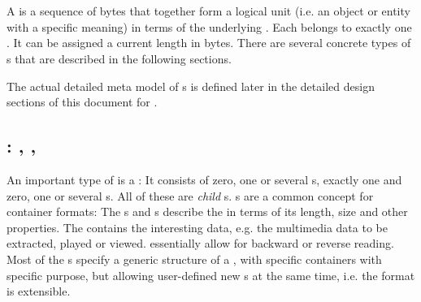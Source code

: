 
\section{\TERMdataBlocks{}}
\label{sec:DataBlocks}

A \TERMdataBlock{} is a sequence of bytes that together form a logical unit (i.e. an object or entity with a specific meaning) in terms of the underlying \TERMdataFormat{}. Each \TERMdataBlock{} belongs to exactly one \TERMdataFormat{}. It can be assigned a current length in bytes. There are several concrete types of \TERMdataBlock{}s that are described in the following sections.

The actual detailed meta model of \TERMdataBlock{}s is defined later in the detailed \LibName{} design sections of this document for \COMPdataFormatManagement{}.


\subsection{\TERMcontainer{}: \TERMpayload{}, \TERMheader{}, \TERMfooter{}}
\label{sec:Containers}

An important type of \TERMdataBlock{} is a \TERMcontainer{}: It consists of zero, one or several \TERMheader{}s, exactly one \TERMpayload{} and zero, one or several \TERMfooter{}s. All of these are \emph{child} \TERMdataBlock{}s. \TERMcontainer{}s are a common concept for container formats: The \TERMheader{}s and \TERMfooter{}s describe the \TERMcontainer{} in terms of its length, size and other properties. The \TERMpayload{} contains the interesting data, e.g. the multimedia data to be extracted, played or viewed. \TERMfooter{} essentially allow for backward or reverse reading. Most of the \TERMdataFormat{}s specify a generic structure of a \TERMcontainer{}, with specific containers with specific purpose, but allowing user-defined new \TERMcontainer{}s at the same time, i.e. the format is extensible.


\subsection{\TERMtag{}}
\label{sec:Tag}

